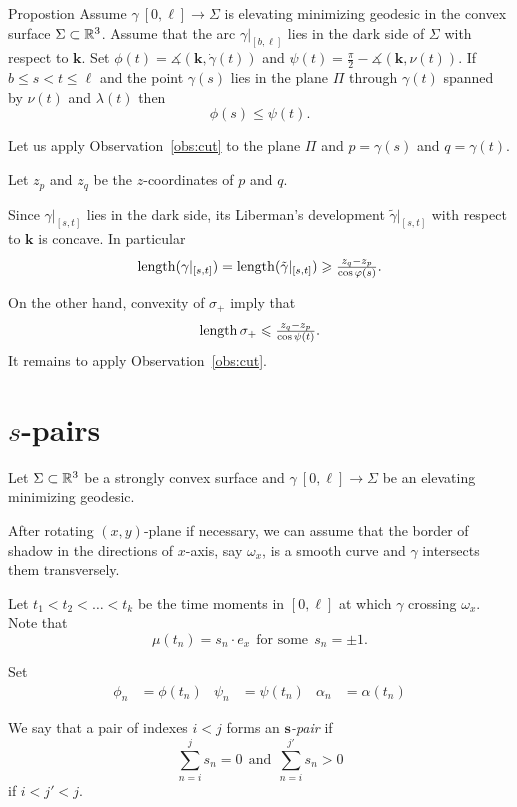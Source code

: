 \documentclass[a4paper,10pt]{amsart}
\begin{document}
\begin{thm}{Propostion}\label{prop:phi-psi}
Assume $\gamma\:[0,\ell]\to \Sigma$ is elevating minimizing geodesic in the convex surface $\Sigma\subset \mathbb{R}^3$.
Assume that the arc $\gamma|_{[b,\ell]}$ lies in the dark side of $\Sigma$ with respect to $\bm{k}$.
Set $\phi(t)=\measuredangle(\bm{k},\dot\gamma(t))$ and $\psi(t)=\tfrac\pi2-\measuredangle(\bm{k},\nu(t))$.
If $b\le s<t\le \ell$ and the point $\gamma(s)$ lies in the plane $\Pi$ through $\gamma(t)$ spanned by $\nu(t)$ and $\lambda(t)$
then 
\[\phi(s)\le \psi(t).\]
\end{thm}

Let us apply Observation~\ref{obs:cut} to the plane $\Pi$ and $p=\gamma(s)$ and $q=\gamma(t)$.

Let $z_p$ and $z_q$ be the $z$-coordinates of $p$ and $q$.

Since $\gamma|_{[s,t]}$ lies in the dark side,
its Liberman's development $\tilde\gamma|_{[s,t]}$ 
with respect to $\bm{k}$ is concave.
In particular 
\[\mathop{\rm length}\nolimits(\gamma|_{[s,t]})
=
\mathop{\rm length}\nolimits(\tilde\gamma|_{[s,t]})
\geqslant
\tfrac{z_q-z_p}{\cos\varphi(s)}.\]

On the other hand, convexity of $\sigma_+$ imply that
\[\mathop{\rm length}\nolimits\sigma_+\leqslant \tfrac{z_q-z_p}{\cos\psi(t)}.\]
It remains to apply Observation~\ref{obs:cut}.
\qeds

\section{$s$-pairs}

Let $\Sigma\subset \mathbb{R}^3$ 
be a strongly convex surface
and $\gamma\:[0,\ell]\to\Sigma$ be an elevating minimizing geodesic.

After rotating $(x,y)$-plane if necessary, 
we can assume that the border of shadow in the directions of $x$-axis, say $\omega_x$, 
is a smooth curve and $\gamma$ intersects them transversely.

Let $t_1<t_2<\dots<t_k$ be the time moments in $[0,\ell]$ 
at which $\gamma$ crossing $\omega_x$.
Note that 
\[\mu(t_n)=s_n\cdot e_x\ \ \text{for some}\ \  s_n=\pm1.\]

Set
\begin{align*}
\phi_n&=\phi(t_n)
&
\psi_n&=\psi(t_n)
&
\alpha_n&=\alpha(t_n)
\end{align*}

We say that a pair of indexes $i<j$
forms an \emph{$\bm{s}$-pair} 
if 
\[
\sum_{n=i}^js_n=0\ \ 
\text{and}\ \ 
\sum_{n=i}^{j'}s_n>0
\]
if $i<j'<j$.
\end{document}
